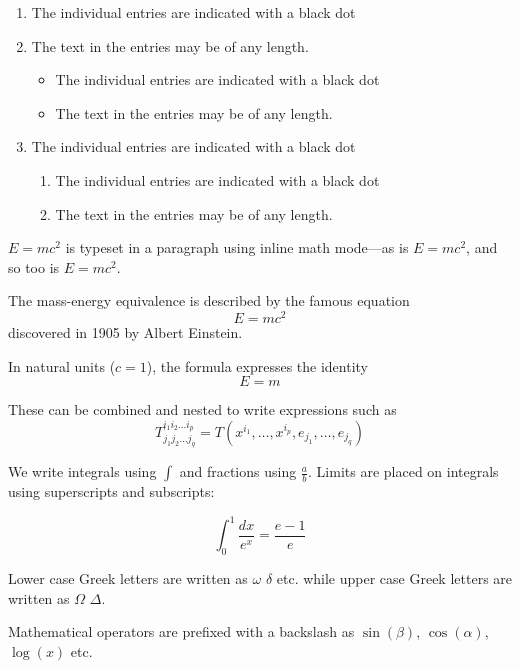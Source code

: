 \documentclass[12pt, letterpaper]{article}
\begin{document}
\begin{enumerate}
  \item The individual entries are indicated with a black dot
  \item The text in the entries may be of any length.
    \begin{itemize}
      \item The individual entries are indicated with a black dot
      \item The text in the entries may be of any length.
    \end{itemize}
  \item The individual entries are indicated with a black dot
    \begin{enumerate}
      \item The individual entries are indicated with a black dot
      \item The text in the entries may be of any length.
    \end{enumerate}
\end{enumerate}

\begin{math}
E=mc^2
\end{math} is typeset in a paragraph using inline math mode---as is $E=mc^2$, and so too is \(E=mc^2\).

The mass-energy equivalence is described by the famous equation
\[ E=mc^2 \] discovered in 1905 by Albert Einstein. 

In natural units ($c = 1$), the formula expresses the identity
\begin{equation}
E=m
\end{equation}

These can be combined and nested to write expressions such as
\[ T^{i_1 i_2 \dots i_p}_{j_1 j_2 \dots j_q} = T(x^{i_1},\dots,x^{i_p},e_{j_1},\dots,e_{j_q}) \]
 
We write integrals using $\int$ and fractions using $\frac{a}{b}$. Limits are placed on integrals using superscripts and subscripts:

\[ \int_0^1 \frac{dx}{e^x} =  \frac{e-1}{e} \]

Lower case Greek letters are written as $\omega$ $\delta$ etc. while upper case Greek letters are written as $\Omega$ $\Delta$.

Mathematical operators are prefixed with a backslash as $\sin(\beta)$, $\cos(\alpha)$, $\log(x)$ etc.

\newpage
\end{document}
